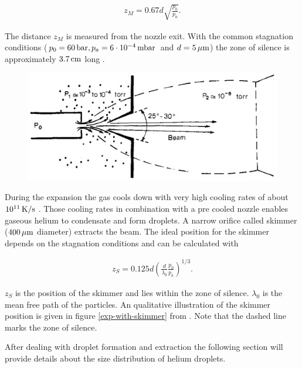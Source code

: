 \documentclass[parskip,12pt,headsepline,a4paper] {scrbook}
\begin{document}
\begin{align}  \label{mach-dist}
z_M = 0.67d\sqrt{\frac{p_0}{p_a}}.
\end{align}

The distance $z_M$ is measured from the nozzle exit. With the common stagnation conditions ($p_0 = \unit[60]{bar}, p_a = \unit[6\cdot10^{-4}]{mbar}$ and $d = \unit[5]{\mu m}$) the zone of silence is approximately $\unit[3.7]{cm}$ long \cite{skimmer-pos}.

\begin{figure}[ht]
\centerline{
\includegraphics[width=13cm]{./expansion/with-skimmer.jpg}}
\end{figure}

During the expansion the gas cools down with very high cooling rates of about $\unit[10^{11}]{K/s}$ \cite{stein}. Those cooling rates in combination with a pre cooled nozzle enables gaseous helium to condensate and form droplets. A narrow orifice called skimmer ($\unit[400]{\mu m}$ diameter) extracts the beam. The ideal position for the skimmer depends on the stagnation conditions and can be calculated with

\begin{align}  \label{skimmer-position}
z_S = 0.125d\left(\frac{d}{\lambda_0}\frac{p_0}{p_a}\right)^{1/3}.
\end{align}

$z_S$ is the position of the skimmer and lies within the zone of silence. $\lambda_0$ is the mean free path of the particles. An qualitative illustration of the skimmer position is given in figure \ref{exp-with-skimmer} from \cite{skimmer-pos}. Note that the dashed line marks the zone of silence.

After dealing with droplet formation and extraction the following section will provide details about the size distribution of helium droplets.
\end{document}
